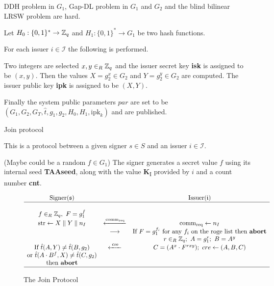 DDH problem in $G_1$, Gap-DL problem in $G_1$ and $G_2$ and the blind bilinear LRSW problem are hard.

Let $H_0 : \{0,1\}^\ast \rightarrow {\mathbb Z}_q$ and $H_1 : \{ 0 , 1 \}^\ast \rightarrow G_1$ be two hash functions.

For each issuer $i \in \mathcal{I}$ the following is performed.

Two integers are selected $x,y \in_R {\mathbb Z}_q$ and the issuer secret key \textbf{isk} is assigned to be $(x,y)$. Then the values $X = g_2^{x} \in G_2$ and $Y = g_2^{y} \in G_2$ are computed. The issuer public key \textbf{ipk} is assigned to be $(X,Y)$.

Finally the system public parameters $par$ are set to be $(G_1, G_2, G_T, \hat{t}, g_1, g_2, H_0, H_1, \text{ipk
}_k)$ and are published.

Join protocol

This is a protocol between a given signer $s \in S$  and an issuer $i \in \mathcal{I}$.


(Maybe could be a random $f \in G_1$)
The signer generates a secret value $f$ using its internal seed \textbf{TAAseed}, along with the value \textbf{K}\textsubscript{I} provided by $i$ and a count number \textbf{cnt}.

\begin{figure}[H]
$$
\begin{array}{ccc}
    \text{Signer}(\mathfrak{s}) &    & \text{Issuer}(\mathfrak{i}) \\
    \hline
    \\
    f \in_R {\mathbb Z}_q, \ F = g_1^f &    &    \\
    \text{str} \leftarrow X \parallel Y \parallel n_I &  \xleftarrow{\text{comm}_{\text{req}}} & \text{comm}_{\text{req}} \leftarrow n_I \\
        & \longrightarrow & \text{If } F = g_1^{f_i} \text{ for any } f_i \text{ on the roge list then \textbf{abort}} \\
        &        & r\in_R {\mathbb Z}_q; \ A = g_1^r; \ B = A^y \\
    \text{If } \hat{t}(A,Y) \neq \hat{t}(B,g_2) & \xleftarrow{\text{  cre  }} & C = (A^x \cdot F^{rxy}); \ cre \leftarrow(A,B,C) \\
    \text{or } \hat{t}(A \cdot B^f , X) \neq \hat{t}(C,g_2) &    & \\
    \text{then \textbf{abort}} &    & \\
    \hline
\end{array} 
$$
\caption{The Join Protocol}
\label{fig:join}
\end{figure}

